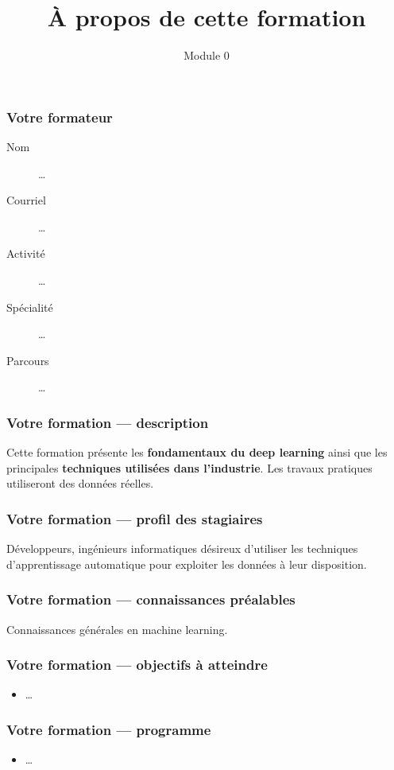 \documentclass{formation}
\title{À propos de cette formation}
\subtitle{Module 0}
\begin{document}
\maketitle

\begin{frame}
  \frametitle{Votre formateur}
  \begin{description}
  \item[Nom] …
  \item[Courriel] …
  \item[Activité] …
  \item[Spécialité] …
  \item[Parcours] …
  \end{description}
\end{frame}

\begin{frame}
  \frametitle{Votre formation — description}

  Cette formation présente les \textbf{fondamentaux du deep learning}
  ainsi que les principales \textbf{techniques utilisées dans
    l’industrie}. Les travaux pratiques utiliseront des données
  réelles.
\end{frame}

\begin{frame}
  \frametitle{Votre formation — profil des stagiaires}

  Développeurs, ingénieurs informatiques désireux d’utiliser les
  techniques d’apprentissage automatique pour exploiter les données à
  leur disposition.
\end{frame}

\begin{frame}
  \frametitle{Votre formation — connaissances préalables}

  Connaissances générales en machine learning.
\end{frame}

\begin{frame}
  \frametitle{Votre formation — objectifs à atteindre}

  \begin{itemize}
  \item …
  \end{itemize}
\end{frame}

\begin{frame}
  \frametitle{Votre formation — programme}

  \begin{itemize}
  \item …
  \end{itemize}
\end{frame}
\end{document}
